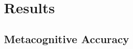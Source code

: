 \documentclass[acmlarge,review=true, anonymous=true]{acmart}
\begin{document}


\section{Results}

\subsection{Metacognitive Accuracy}


\end{document}
